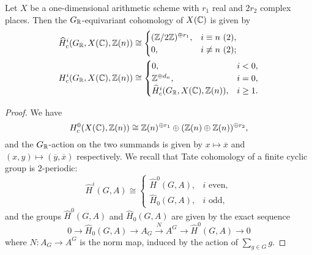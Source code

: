 \documentclass{article}
\numberwithin{equation}{section}
\begin{document}
\begin{proposition}
  Let $X$ be a one-dimensional arithmetic scheme with $r_1$ real and $2r_2$
  complex places. Then the $G_{\mathbb{R}}$-equivariant cohomology of $X(\mathbb{C})$ is given
  by
  \begin{align*}
    \widehat{H}^i_c (G_{\mathbb{R}}, X(\mathbb{C}), \mathbb{Z} (n)) & \cong
                                              \begin{cases}
                                                (\mathbb{Z}/2\mathbb{Z})^{\oplus r_1}, & i \equiv n ~ (2), \\
                                                0, & i \not\equiv n ~ (2);
                                              \end{cases} \\
    H^i_c (G_{\mathbb{R}}, X(\mathbb{C}), \mathbb{Z} (n)) & \cong
                                    \begin{cases}
                                      0, & i < 0, \\
                                      \mathbb{Z}^{\oplus d_n}, & i = 0, \\
                                      \widehat{H}^i_c (G_{\mathbb{R}}, X(\mathbb{C}), \mathbb{Z} (n)), & i \ge 1.
                                    \end{cases}
  \end{align*}

  \begin{proof}
    We have
    \[ H^0_c (X(\mathbb{C}), \mathbb{Z}(n)) \cong
      \mathbb{Z} (n)^{\oplus r_1} \oplus (\mathbb{Z} (n) \oplus \mathbb{Z} (n))^{\oplus r_2}, \]
    and the $G_{\mathbb{R}}$-action on the two summands is given by
    $x \mapsto \overline{x}$ and $(x,y) \mapsto (\overline{y}, \overline{x})$
    respectively. We recall that Tate cohomology of a finite cyclic group is
    $2$-periodic:
    \[ \widehat{H}^i (G,A) \cong
      \begin{cases}
        \widehat{H}^0 (G,A), & i\text{ even}, \\
        \widehat{H}_0 (G,A), & i\text{ odd},
      \end{cases} \]
    and the groups $\widehat{H}^0 (G,A)$ and $\widehat{H}_0 (G,A)$ are given by
    the exact sequence
    \[ 0 \to \widehat{H}_0 (G,A) \to
      A_G \xrightarrow{N} A^G \to
      \widehat{H}^0 (G,A) \to 0 \]
    where $N\colon A_G\to A^G$ is the norm map, induced by the action of
    $\sum_{g\in G} g$.

    \vspace{1em}


\end{proof}
\end{proposition}
\end{document}
